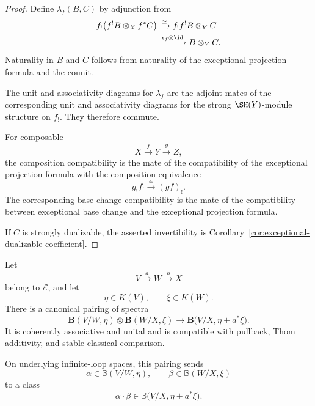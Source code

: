 \begin{proof}
Define \(\lambda_f(B,C)\) by adjunction from
\[
\begin{aligned}
    f_!
    \bigl(
      f^!B\otimes_Xf^*C
    \bigr)
    &\xrightarrow{\simeq}
    f_!f^!B\otimes_YC \\
    &\xrightarrow{\epsilon_f\otimes\id}
    B\otimes_YC.
\end{aligned}
\]
Naturality in \(B\) and \(C\) follows from naturality of the exceptional
projection formula and the counit.

The unit and associativity diagrams for \(\lambda_f\) are the adjoint mates
of the corresponding unit and associativity diagrams for the strong
\(\SH(Y)\)-module structure on \(f_!\).  They therefore commute.

For composable
\[
    X\xrightarrow{f}Y\xrightarrow{g}Z,
\]
the composition compatibility is the mate of the compatibility of the
exceptional projection formula with the composition equivalence
\[
    g_!f_!
    \xrightarrow{\simeq}
    (gf)_!.
\]
The corresponding base-change compatibility is the mate of the
compatibility between exceptional base change and the exceptional
projection formula.

If \(C\) is strongly dualizable, the asserted invertibility is
Corollary~\ref{cor:exceptional-dualizable-coefficient}.
\end{proof}

\begin{proposition}
\label{prop:bivariant-composition-product}
Let
\[
    V\xrightarrow{a}W\xrightarrow{b}X
\]
belong to \(\mathcal E\), and let
\[
    \eta\in K(V),
    \qquad
    \xi\in K(W).
\]
There is a canonical pairing of spectra
\[
    \mathbf B(V/W,\eta)
    \otimes
    \mathbf B(W/X,\xi)
    \longrightarrow
    \mathbf B
    \bigl(
      V/X,
      \eta+a^*\xi
    \bigr).
\]
It is coherently associative and unital and is compatible with pullback,
Thom additivity, and stable classical comparison.

On underlying infinite-loop spaces, this pairing sends
\[
    \alpha\in\mathbb B(V/W,\eta),
    \qquad
    \beta\in\mathbb B(W/X,\xi)
\]
to a class
\[
    \alpha\cdot\beta
    \in
    \mathbb B
    \bigl(
      V/X,
      \eta+a^*\xi
    \bigr).
\]
\end{proposition}

